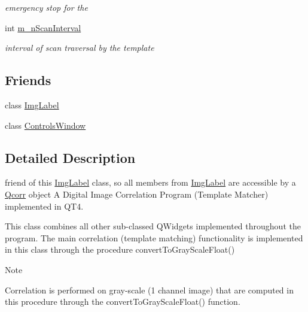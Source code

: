 \begin{DoxyCompactItemize}
\begin{DoxyCompactList}\small\item\em emergency stop for the \item\end{DoxyCompactList}\item 
\hypertarget{classQcorr_ab07379fbbd7be906023eb5ec4d555931}{
int \hyperlink{classQcorr_ab07379fbbd7be906023eb5ec4d555931}{m\_\-nScanInterval}}
\label{classQcorr_ab07379fbbd7be906023eb5ec4d555931}

\begin{DoxyCompactList}\small\item\em interval of scan traversal by the template \item\end{DoxyCompactList}\end{DoxyCompactItemize}
\subsection*{Friends}
\begin{DoxyCompactItemize}
\item 
\hypertarget{classQcorr_a5b4b2caf4c596b601dd096785e4a32b9}{
class \hyperlink{classQcorr_a5b4b2caf4c596b601dd096785e4a32b9}{ImgLabel}}
\label{classQcorr_a5b4b2caf4c596b601dd096785e4a32b9}

\item 
\hypertarget{classQcorr_ace49e9a34b2d2df1e7683be4cacba1d8}{
class \hyperlink{classQcorr_ace49e9a34b2d2df1e7683be4cacba1d8}{ControlsWindow}}
\label{classQcorr_ace49e9a34b2d2df1e7683be4cacba1d8}

\end{DoxyCompactItemize}


\subsection{Detailed Description}
friend of this \hyperlink{classImgLabel}{ImgLabel} class, so all members from \hyperlink{classImgLabel}{ImgLabel} are accessible by a \hyperlink{classQcorr}{Qcorr} object A Digital Image Correlation Program (Template Matcher) implemented in QT4.

This class combines all other sub-\/classed QWidgets implemented throughout the program. The main correlation (template matching) functionality is implemented in this class through the procedure convertToGrayScaleFloat()

\begin{DoxyNote}{Note}

\end{DoxyNote}
Correlation is performed on gray-\/scale (1 channel image) that are computed in this procedure through the convertToGrayScaleFloat() function.

